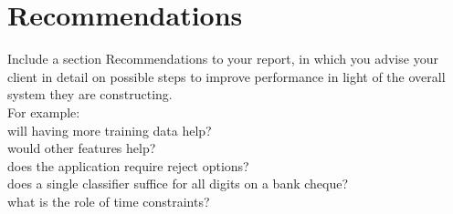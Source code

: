 \section{Recommendations}

Include a section Recommendations to your report, in which you advise your client in detail on possible steps to improve performance in light of the overall system they are constructing. \\
For example:\\
will having more training data help?\\
would other features help? \\
does the application require reject options? \\
does a single classifier suffice for all digits on a bank cheque? \\
what is the role of time constraints?

